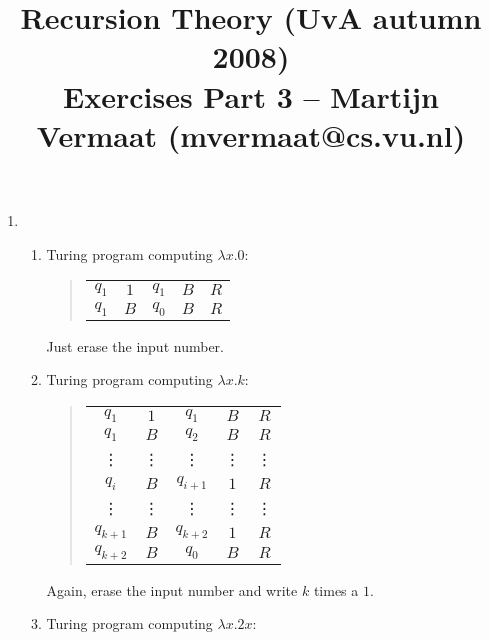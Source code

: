 \documentclass[a4paper,11pt]{article}
\title{Recursion Theory (UvA autumn 2008)\\
\normalsize{Exercises Part 3 -- Martijn Vermaat (mvermaat@cs.vu.nl)}}
\date{}
\begin{document}
\maketitle


\begin{enumerate}


\item %
\begin{enumerate}
\item Turing program computing $\lambda x.0$:

\begin{quote}
\begin{tabular}{ccccc}
  $q_1$ & $1$ & $q_1$ & $B$ & $R$\\
  $q_1$ & $B$ & $q_0$ & $B$ & $R$
\end{tabular}
\end{quote}

Just erase the input number.

\item Turing program computing $\lambda x.k$:

\begin{quote}
\begin{tabular}{ccccc}
  $q_1$ & $1$ & $q_1$ & $B$ & $R$\\
  $q_1$ & $B$ & $q_2$ & $B$ & $R$\\
  \vdots & \vdots & \vdots & \vdots & \vdots\\
  $q_i$ & $B$ & $q_{i+1}$ & $1$ & $R$\\
  \vdots & \vdots & \vdots & \vdots & \vdots\\
  $q_{k+1}$ & $B$ & $q_{k+2}$ & $1$ & $R$\\
  $q_{k+2}$ & $B$ & $q_0$ & $B$ & $R$
\end{tabular}
\end{quote}

Again, erase the input number and write $k$ times
a $1$.

\item Turing program computing $\lambda x.2x$:


\end{enumerate}
\end{enumerate}
\end{document}
